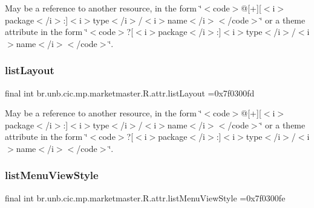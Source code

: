 May be a reference to another resource, in the form \char`\"{}$<$code$>$@\mbox{[}+\mbox{]}\mbox{[}$<$i$>$package$<$/i$>$\+:\mbox{]}$<$i$>$type$<$/i$>$/$<$i$>$name$<$/i$>$$<$/code$>$\char`\"{} or a theme attribute in the form \char`\"{}$<$code$>$?\mbox{[}$<$i$>$package$<$/i$>$\+:\mbox{]}$<$i$>$type$<$/i$>$/$<$i$>$name$<$/i$>$$<$/code$>$\char`\"{}. \mbox{\label{classbr_1_1unb_1_1cic_1_1mp_1_1marketmaster_1_1R_1_1attr_a877b152113c9c843df3413acebef56e7}} 
\subsubsection{\texorpdfstring{list\+Layout}{listLayout}}
{\footnotesize\ttfamily final int br.\+unb.\+cic.\+mp.\+marketmaster.\+R.\+attr.\+list\+Layout =0x7f0300fd\hspace{0.3cm}{\ttfamily [static]}}

May be a reference to another resource, in the form \char`\"{}$<$code$>$@\mbox{[}+\mbox{]}\mbox{[}$<$i$>$package$<$/i$>$\+:\mbox{]}$<$i$>$type$<$/i$>$/$<$i$>$name$<$/i$>$$<$/code$>$\char`\"{} or a theme attribute in the form \char`\"{}$<$code$>$?\mbox{[}$<$i$>$package$<$/i$>$\+:\mbox{]}$<$i$>$type$<$/i$>$/$<$i$>$name$<$/i$>$$<$/code$>$\char`\"{}. \mbox{\label{classbr_1_1unb_1_1cic_1_1mp_1_1marketmaster_1_1R_1_1attr_a357cb87d25d864def0c2b90c06a56b76}} 
\subsubsection{\texorpdfstring{list\+Menu\+View\+Style}{listMenuViewStyle}}
{\footnotesize\ttfamily final int br.\+unb.\+cic.\+mp.\+marketmaster.\+R.\+attr.\+list\+Menu\+View\+Style =0x7f0300fe\hspace{0.3cm}{\ttfamily [static]}}

